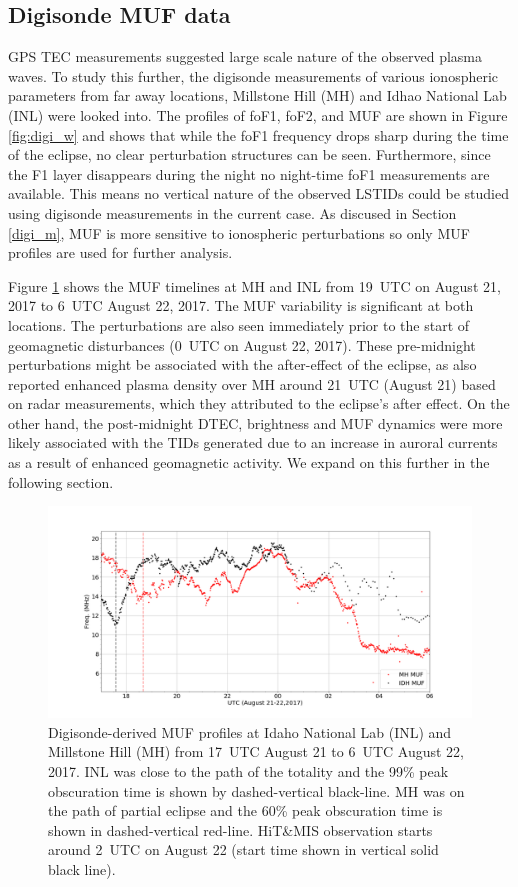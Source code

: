\documentclass[crop=false,class=mitthesis,oneside,font=12pt]{standalone}
\begin{document}
\subsection{Digisonde MUF data}
GPS TEC measurements suggested large scale nature of the observed plasma waves. To study this further, the digisonde measurements of various ionospheric parameters from far away locations, Millstone Hill (MH) and Idhao National Lab (INL) were looked into. The profiles of foF1, foF2, and MUF are shown in Figure \ref{fig:digi_w} and shows that while the foF1 frequency drops sharp during the time of the eclipse, no clear perturbation structures can be seen. Furthermore, since the F1 layer disappears during the night no night-time foF1 measurements are available. This means no vertical nature of the observed LSTIDs could be studied using digisonde measurements in the current case. As discused in Section \ref{digi_m}, MUF is more sensitive to ionospheric perturbations so only MUF profiles are used for further analysis.

Figure \ref{fig:digi} shows the MUF timelines at MH and INL from 19~UTC on August 21, 2017 to 6~UTC August 22, 2017. The MUF variability is significant at both locations. The perturbations are also seen immediately prior to the start of geomagnetic disturbances (0~UTC on August 22, 2017). These pre-midnight perturbations might be associated with the after-effect of the eclipse, as \citet{goncharenko_mh_hill_eclipse} also reported enhanced plasma density over MH around 21~UTC (August 21) based on radar measurements, which they attributed to the eclipse's after effect. On the other hand, the post-midnight DTEC, brightness and MUF dynamics were more likely associated with the TIDs generated due to an increase in auroral currents as a result of enhanced geomagnetic activity. We expand on this further in the following section.

\begin{figure}[H]
\centering\includegraphics[width=35pc]{digi_muf_21-22.png}
\caption{Digisonde-derived MUF profiles at Idaho National Lab (INL) and Millstone Hill (MH) from 17~UTC August 21 to 6~UTC August 22, 2017. INL was close to the path of the totality and the  99\% peak obscuration time is shown by dashed-vertical black-line. MH was on the path of partial eclipse and the 60\% peak obscuration time is shown in dashed-vertical red-line. HiT\&MIS observation starts around 2~UTC on August 22 (start time shown in vertical solid black line).}
\label{fig:digi}
\end{figure}
\end{document}

